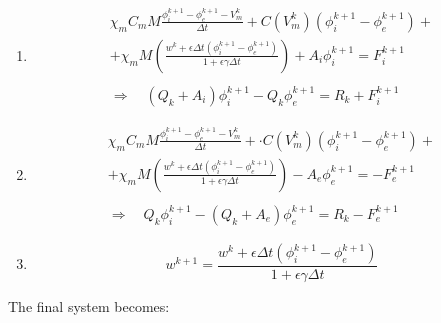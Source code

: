 \documentclass[a4paper,11pt]{article}
\begin{document}
\begin{enumerate}
\item
\begin{equation*}
\begin{gathered}
\chi_m C_m M \frac{	\phi_i^{k+1}-\phi_e^{k+1}-V_m^{k}}{\Delta t} +  C(V_m^k) (\phi_i^{k+1}-\phi_e^{k+1}) + \\
 +\chi_m M \left(\frac{w^k + \epsilon \Delta t (\phi_i^{k+1}-\phi_e^{k+1})}{1+\epsilon \gamma \Delta t}   \right)
+ A_i \phi_i ^{k+1} = F_i^{k+1} \\ \\
\Rightarrow \quad (Q_k + A_i) \phi_i^{k+1} - Q_k \phi_e^{k+1} =R_k +  F_i^{k+1}
\end{gathered}
\end{equation*}
\item
\begin{equation*}
\begin{gathered}
\chi_m C_m M \frac{	\phi_i^{k+1}-\phi_e^{k+1}-V_m^{k}}{\Delta t} + \cdot C(V_m^k) (\phi_i^{k+1}-\phi_e^{k+1}) +\\ 
+ \chi_m M \left(\frac{w^k + \epsilon \Delta t (\phi_i^{k+1}-\phi_e^{k+1})}{1+\epsilon \gamma \Delta t}   \right)
- A_e \phi_e ^{k+1} = -F_e^{k+1} \\ \\
\Rightarrow \quad Q_k \phi_i^{k+1} - (Q_k+A_e) \phi_e^{k+1} =R_k - F_e^{k+1}
\end{gathered}
\end{equation*}
\item 
\begin{equation*}
w^{k+1} = \frac{w^k + \epsilon \Delta t (\phi_i^{k+1}-\phi_e^{k+1})}{1+\epsilon \gamma \Delta t}
\end{equation*}
\end{enumerate}
\vspace{4mm}
The final system becomes: \\
\end{document}
